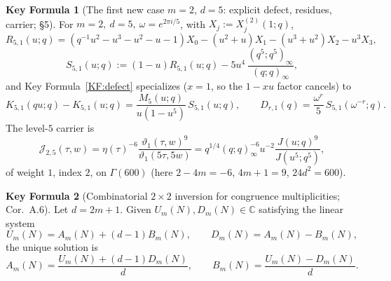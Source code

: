 \documentclass[11pt]{article}
\newcommand{\C}{\mathbb{C}}
\newcommand{\JJ}{\mathcal{J}}
\theoremstyle{definition}
\newtheorem{keyformula}{Key Formula}
\begin{document}
\begin{keyformula}[The first new case $m=2$, $d=5$: explicit defect, residues, carrier; \S5]\label{KF:level5}
For $m=2,\ d=5,\ \omega=e^{2\pi i/5}$, with $X_j:=X_j^{(2)}(1;q)$,
\[
R_{5,1}(u;q)=(q^{-1}u^2-u^3-u^2-u-1)X_0-(u^2+u)X_1-(u^3+u^2)X_2-u^3X_3,
\]
\[
S_{5,1}(u;q):=(1-u)R_{5,1}(u;q)-5u^4\,\frac{(q^5;q^5)_\infty}{(q;q)_\infty},
\]
and Key Formula~\ref{KF:defect} specializes ($x=1$, so the $1-xu$ factor cancels) to
\[
K_{5,1}(qu;q)-K_{5,1}(u;q)=\frac{M_5(u;q)}{u(1-u^5)}\,S_{5,1}(u;q),
\qquad
D_{r,1}(q)=\frac{\omega^r}{5}\,S_{5,1}(\omega^{-r};q).
\]
The level-$5$ carrier is
\[
\JJ_{2,5}(\tau,w)=\eta(\tau)^{-6}\frac{\vartheta_1(\tau,w)^9}{\vartheta_1(5\tau,5w)}
=q^{1/4}(q;q)_\infty^{-6}u^{-2}\frac{J(u;q)^9}{J(u^5;q^5)},
\]
of weight $1$, index $2$, on $\Gamma(600)$ (here $2-4m=-6$, $4m+1=9$, $24d^2=600$).
\end{keyformula}

\begin{keyformula}[Combinatorial $2\times2$ inversion for congruence multiplicities; Cor.~A.6]\label{KF:combi}
Let $d=2m+1$. Given $U_m(N),D_m(N)\in\C$ satisfying the linear system
\[
U_m(N)=A_m(N)+(d-1)B_m(N),
\qquad
D_m(N)=A_m(N)-B_m(N),
\]
the unique solution is
\[
A_m(N)=\frac{U_m(N)+(d-1)D_m(N)}{d},
\qquad
B_m(N)=\frac{U_m(N)-D_m(N)}{d}.
\]
\end{keyformula}
\end{document}

